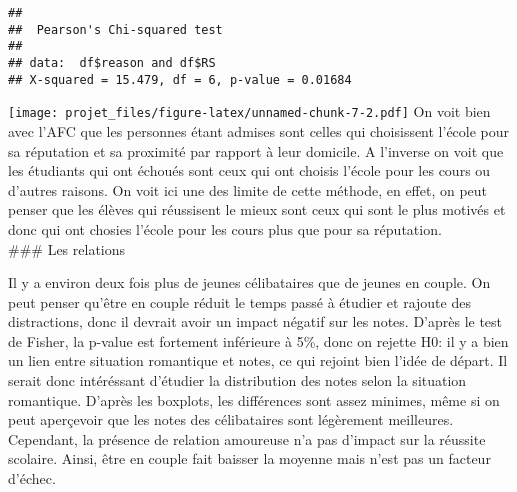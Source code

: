 \documentclass[
]{article}
\newenvironment{Shaded}{\begin{snugshade}}{\end{snugshade}}
\newcommand{\CommentTok}[1]{\textcolor[rgb]{0.56,0.35,0.01}{\textit{#1}}}
\newcommand{\FunctionTok}[1]{\textcolor[rgb]{0.00,0.00,0.00}{#1}}
\newcommand{\NormalTok}[1]{#1}
\newcommand{\OtherTok}[1]{\textcolor[rgb]{0.56,0.35,0.01}{#1}}
\newcommand{\SpecialCharTok}[1]{\textcolor[rgb]{0.00,0.00,0.00}{#1}}
\begin{document}
\begin{verbatim}
## 
##  Pearson's Chi-squared test
## 
## data:  df$reason and df$RS
## X-squared = 15.479, df = 6, p-value = 0.01684
\end{verbatim}

\begin{Shaded}
\end{Shaded}

\texttt{[image: projet\_files/figure-latex/unnamed-chunk-7-2.pdf]} On
voit bien avec l'AFC que les personnes étant admises sont celles qui
choisissent l'école pour sa réputation et sa proximité par rapport à
leur domicile. A l'inverse on voit que les étudiants qui ont échoués
sont ceux qui ont choisis l'école pour les cours ou d'autres raisons. On
voit ici une des limite de cette méthode, en effet, on peut penser que
les élèves qui réussisent le mieux sont ceux qui sont le plus motivés et
donc qui ont chosies l'école pour les cours plus que pour sa
réputation.\\
\#\#\# Les relations

Il y a environ deux fois plus de jeunes célibataires que de jeunes en
couple. On peut penser qu'être en couple réduit le temps passé à étudier
et rajoute des distractions, donc il devrait avoir un impact négatif sur
les notes. D'après le test de Fisher, la p-value est fortement
inférieure à 5\%, donc on rejette H0: il y a bien un lien entre
situation romantique et notes, ce qui rejoint bien l'idée de départ. Il
serait donc intéréssant d'étudier la distribution des notes selon la
situation romantique. D'après les boxplots, les différences sont assez
minimes, même si on peut aperçevoir que les notes des célibataires sont
légèrement meilleures. Cependant, la présence de relation amoureuse n'a
pas d'impact sur la réussite scolaire. Ainsi, être en couple fait
baisser la moyenne mais n'est pas un facteur d'échec.
\end{document}
